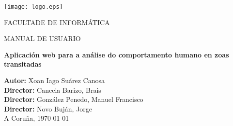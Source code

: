 \begin{titlepage}
\begin{center}

\texttt{[image: logo.eps]}

\vspace{0.5cm}
FACULTADE DE INFORMÁTICA

\vspace*{1cm}

\Large{MANUAL DE USUARIO}

\vspace*{3cm}

\textbf{\LARGE{Aplicación web para a análise do comportamento humano en zoas transitadas}}

\end{center}

\vspace*{4cm}

\begin{flushright}
\large{
\textbf{Autor:} Xoan Iago Suárez Canosa\\
\textbf{Director:} Cancela Barizo, Brais \\
\textbf{Director:} González Penedo, Manuel Francisco \\
\textbf{Director:} Novo Buján, Jorge \\
\vspace{0.5cm}
A Coruña, \today}
\end{flushright}

\end{titlepage}
